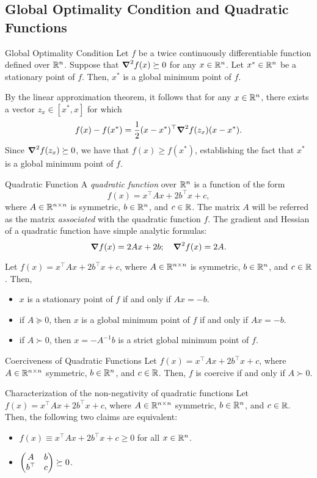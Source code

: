 \subsection{Global Optimality Condition and Quadratic Functions}
\begin{thm}{Global Optimality Condition}
	Let $f$ be a twice continuously differentiable function defined over ${\mathbb{R}}^n$. Suppose that $\grad^2f(x)\succeq0$ for any $x\in{\mathbb{R}}^n$. Let $x^*\in{\mathbb{R}}^n$ be a stationary point of $f$. Then, $x^*$ is a global minimum point of $f$. 
\end{thm}
\begin{prf}
	By the linear approximation theorem, it follows that for any $x\in{\mathbb{R}}^n$, there exists a vector $z_x\in[x^*,x]$ for which \[f(x)-f(x^*)=\dfrac{1}{2}(x-x^*)^\top\grad^2f(z_x)(x-x^*).\] Since $\grad^2f(z_x)\succeq0$, we have that $f(x)\geq f(x^*)$, establishing the fact that $x^*$ is a global minimum point of $f$. 
\end{prf}
\begin{df}{Quadratic Function}
	A \textit{quadratic function} over ${\mathbb{R}}^n$ is a function of the form \[f(x)=x^\top Ax+2b^\top x+c,\] where $A\in{\mathbb{R}}^{n\times n}$ is symmetric, $b\in{\mathbb{R}}^n$, and $c\in{\mathbb{R}}$. The matrix $A$ will be referred as the matrix \textit{associated} with the quadratic function $f$. The gradient and Hessian of a quadratic function have simple analytic formulas: \[\grad f(x)=2Ax+2b;\quad\grad^2f(x)=2A.\]
\end{df}
\begin{lem}{}
	Let	$f(x)=x^\top Ax+2b^\top x+c$, where $A\in{\mathbb{R}}^{n\times n}$ is symmetric, $b\in{\mathbb{R}}^n$, and $c\in{\mathbb{R}}$. Then, 
	\begin{itemize}
		\item $x$ is a stationary point of $f$ if and only if $Ax=-b$.
		\item if $A\succeq0$, then $x$ is a global minimum point of $f$ if and only if $Ax=-b$.
		\item if $A\succ0$, then $x=-A^{-1}b$ is a strict global minimum point of $f$.
	\end{itemize}
\end{lem}
\begin{lem}{Coerciveness of Quadratic Functions}
	Let $f(x)=x^\top Ax+2b^\top x+c$, where $A\in{\mathbb{R}}^{n\times n}$ symmetric, $b\in{\mathbb{R}}^n$, and $c\in{\mathbb{R}}$. Then, $f$ is coercive if and only if $A\succ0$.
\end{lem}
\begin{thm}{Characterization of the non-negativity of quadratic functions}
	Let $f(x)=x^\top Ax+2b^\top x+c$, where $A\in{\mathbb{R}}^{n\times n}$ symmetric, $b\in{\mathbb{R}}^n$, and $c\in{\mathbb{R}}$. Then, the following two claims are equivalent: 
	\begin{itemize}
		\item $f(x)\equiv x^\top Ax+2b^\top x+c\geq0$ for all $x\in{\mathbb{R}}^n$.
		\item $\mqty(A&b\\b^\top&c)\succeq0$.
	\end{itemize}
\end{thm}

